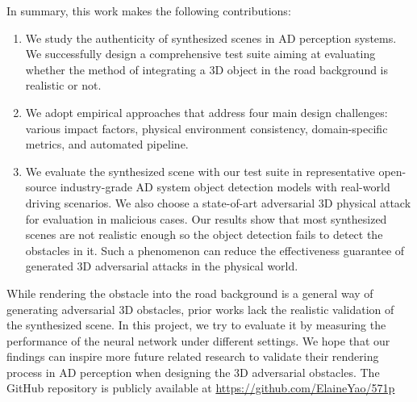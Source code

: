 In summary, this work makes the following contributions:
\begin{enumerate}
	\item We study the authenticity of synthesized scenes in AD perception systems. 
	We successfully design a comprehensive test suite aiming at evaluating whether the method of integrating a 3D object in the road background is realistic or not.
	\item We adopt empirical approaches that address four main design challenges: 
	various impact factors, physical environment consistency, domain-specific metrics, and automated pipeline.
	\item We evaluate the synthesized scene with our test suite in representative open-source industry-grade AD system object detection models with real-world driving scenarios.
	We also choose a state-of-art adversarial 3D physical attack for evaluation in malicious cases.
	Our results show that most synthesized scenes are not realistic enough so the object detection fails to detect the obstacles in it.
	Such a phenomenon can reduce the effectiveness guarantee of generated 3D adversarial attacks in the physical world.
\end{enumerate}

While rendering the obstacle into the road background is a general way of generating adversarial 3D obstacles, 
prior works lack the realistic validation of the synthesized scene. 
In this project, we try to evaluate it by measuring the performance of the neural network under different settings.
We hope that our findings can inspire more future related research to validate their rendering process in AD perception when designing the 3D adversarial obstacles. The GitHub repository is publicly available at \url{https://github.com/ElaineYao/571p}

